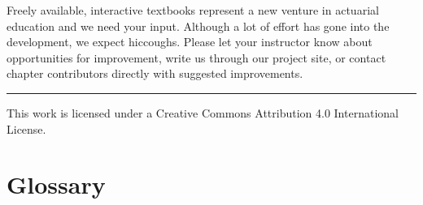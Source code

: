\documentclass[
  12pt,
  krantz2]{Format/krantzNoCorner}
\begin{document}
Freely available, interactive textbooks represent a new venture in actuarial education and we need your input. Although a lot of effort has gone into the development, we expect hiccoughs. Please let your instructor know about opportunities for improvement, write us through our project site, or contact chapter contributors directly with suggested improvements.

\begin{center}\rule{0.5\linewidth}{0.5pt}\end{center}

This work is licensed under a Creative Commons Attribution 4.0 International License.

\mainmatter

\hypertarget{ChapGlossary}{%
\chapter{Glossary}\label{ChapGlossary}}
\end{document}

